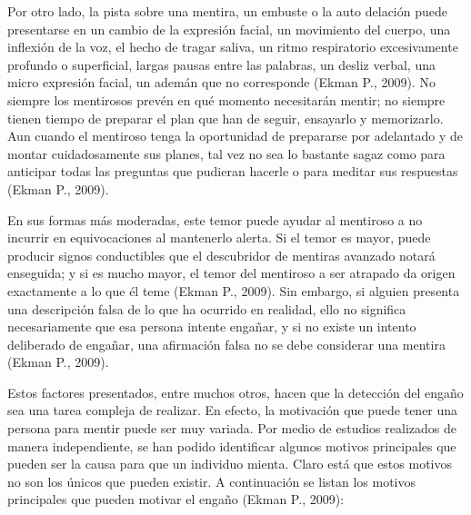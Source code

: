 Por otro lado, la pista sobre una mentira, un embuste o la auto delación puede presentarse en un cambio de la expresión facial, un movimiento del cuerpo, una inflexión de la voz, el hecho de tragar saliva, un ritmo respiratorio excesivamente profundo o superficial, largas pausas entre las palabras, un desliz verbal, una micro expresión facial, un ademán que no corresponde (Ekman P., 2009). No siempre los mentirosos prevén en qué momento necesitarán mentir; no siempre tienen tiempo de preparar el plan que han de seguir, ensayarlo y memorizarlo. Aun cuando el mentiroso tenga la oportunidad de prepararse por adelantado y de montar cuidadosamente sus planes, tal vez no sea lo bastante sagaz como para anticipar todas las preguntas que pudieran hacerle o para meditar sus respuestas (Ekman P., 2009).

En sus formas más moderadas, este temor puede ayudar al mentiroso a no incurrir en equivocaciones al mantenerlo alerta. Si el temor es mayor, puede producir signos conductibles que el descubridor de mentiras avanzado notará enseguida; y si es mucho mayor, el temor del mentiroso a ser atrapado da origen exactamente a lo que él teme (Ekman P., 2009). Sin embargo, si alguien presenta una descripción falsa de lo que ha ocurrido en realidad, ello no significa necesariamente que esa persona intente engañar, y si no existe un intento deliberado de engañar, una afirmación falsa no se debe considerar una mentira (Ekman P., 2009).

Estos factores presentados, entre muchos otros, hacen que la detección del engaño sea una tarea compleja de realizar. En efecto, la motivación que puede tener una persona para mentir puede ser muy variada. Por medio de estudios realizados de manera independiente, se han podido identificar algunos motivos principales que pueden ser la causa para que un individuo mienta. Claro está que estos motivos no son los únicos que pueden existir. A continuación se listan los motivos principales que pueden motivar el engaño (Ekman P., 2009):

